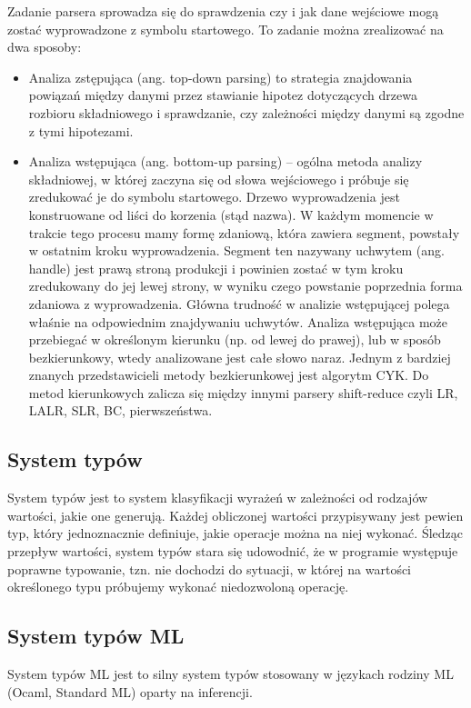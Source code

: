 \documentclass{article}
\begin{document}
Zadanie parsera sprowadza się do sprawdzenia czy i jak dane wejściowe mogą zostać wyprowadzone z symbolu startowego. To zadanie można zrealizować na dwa sposoby:


\begin{itemize}
  \item Analiza zstępująca (ang. top-down parsing) to strategia znajdowania powiązań między danymi przez stawianie hipotez dotyczących drzewa rozbioru składniowego i sprawdzanie, czy zależności między danymi są zgodne z tymi hipotezami.
  \item Analiza wstępująca (ang. bottom-up parsing) – ogólna metoda analizy składniowej, w której zaczyna się od słowa wejściowego i próbuje się zredukować je do symbolu startowego. Drzewo wyprowadzenia jest konstruowane od liści do korzenia (stąd nazwa). W każdym momencie w trakcie tego procesu mamy formę zdaniową, która zawiera segment, powstały w ostatnim kroku wyprowadzenia. Segment ten nazywany uchwytem (ang. handle) jest prawą stroną produkcji i powinien zostać w tym kroku zredukowany do jej lewej strony, w wyniku czego powstanie poprzednia forma zdaniowa z wyprowadzenia. Główna trudność w analizie wstępującej polega właśnie na odpowiednim znajdywaniu uchwytów.
        Analiza wstępująca może przebiegać w określonym kierunku (np. od lewej do prawej), lub w sposób bezkierunkowy, wtedy analizowane jest całe słowo naraz. Jednym z bardziej znanych przedstawicieli metody bezkierunkowej jest algorytm CYK. Do metod kierunkowych zalicza się między innymi parsery shift-reduce czyli LR, LALR, SLR, BC, pierwszeństwa.
\end{itemize}



\subsection{System typów}
System typów jest to system klasyfikacji wyrażeń w zależności od rodzajów wartości, jakie one generują\cite{Pierce__Benjamin__C__2002}. Każdej obliczonej wartości przypisywany jest pewien typ, który jednoznacznie definiuje, jakie operacje można na niej wykonać. Śledząc przepływ wartości, system typów stara się udowodnić, że w programie występuje poprawne typowanie, tzn. nie dochodzi do sytuacji, w której na wartości określonego typu próbujemy wykonać niedozwoloną operację.
\subsection{System typów ML} System typów ML jest to silny system typów stosowany w językach rodziny ML (Ocaml, Standard ML) oparty na inferencji.
\end{document}
